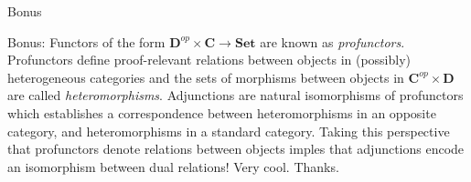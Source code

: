 \documentclass[tikz]{beamer}
\theoremstyle{definition}
\newcommand{\cat}[1]{\mathbf{#1}}
\begin{document}
\begin{frame}{Bonus}

Bonus: Functors of the form $\cat{D}^{op} \times \cat{C} \to \cat{Set}$ are known as \textit{profunctors}. Profunctors define proof-relevant relations between objects in (possibly) heterogeneous categories and the sets of morphisms between objects in $\cat{C}^{op} \times \cat{D}$ are called \textit{heteromorphisms}. Adjunctions are natural isomorphisms of profunctors which establishes a correspondence between heteromorphisms in an opposite category, and heteromorphisms in a standard category. Taking this perspective that profunctors denote relations between objects imples that adjunctions encode an isomorphism between dual relations! Very cool. Thanks. 
\end{frame}
\end{document}
